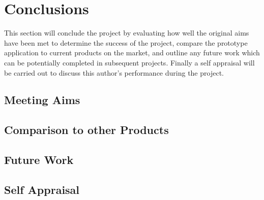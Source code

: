 \section{Conclusions}\label{sec:conclusion}
	This section will conclude the project by evaluating how well the original aims have been met to determine the success of the project, compare the prototype application to current products on the market, and outline any future work which can be potentially completed in subsequent projects. Finally a self appraisal will be carried out to discuss this author's performance during the project.
	\subsection{Meeting Aims}
	\subsection{Comparison to other Products}
	\subsection{Future Work}\label{sec:conclusion_future_work}
	\subsection{Self Appraisal}
